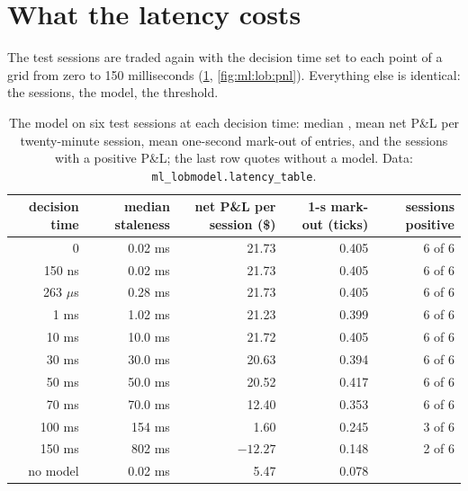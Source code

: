 \section{What the latency costs}

The test sessions are traded again with the decision time set to each point of a grid from zero to 150 milliseconds
(\cref{tab:ml:lob:results}, \cref{fig:ml:lob:pnl}). Everything else is identical: the sessions, the model, the threshold.

\begin{table}[htbp]
\centering\small
\begin{tabular}{@{}rrrrr@{}}
\toprule
decision time & median staleness & net P\&L per session (\$) & 1-s mark-out (ticks) & sessions positive\\
\midrule
0 & 0.02 ms & 21.73 & 0.405 & 6 of 6\\
150 ns & 0.02 ms & 21.73 & 0.405 & 6 of 6\\
263 $\mu$s & 0.28 ms & 21.73 & 0.405 & 6 of 6\\
1 ms & 1.02 ms & 21.23 & 0.399 & 6 of 6\\
10 ms & 10.0 ms & 21.72 & 0.405 & 6 of 6\\
30 ms & 30.0 ms & 20.63 & 0.394 & 6 of 6\\
50 ms & 50.0 ms & 20.52 & 0.417 & 6 of 6\\
70 ms & 70.0 ms & 12.40 & 0.353 & 6 of 6\\
100 ms & 154 ms & 1.60 & 0.245 & 3 of 6\\
150 ms & 802 ms & $-12.27$ & 0.148 & 2 of 6\\
no model & 0.02 ms & 5.47 & 0.078 & \\
\bottomrule
\end{tabular}
\caption{The model on six test sessions at each decision time: median , mean net P\&L per twenty-minute session,
mean one-second mark-out of entries, and the sessions with a positive P\&L; the last row quotes without a model. Data:
\texttt{ml\_lobmodel.latency\_table}.}\label{tab:ml:lob:results}
\end{table}

